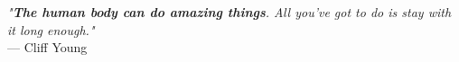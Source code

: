 
\begin{flushright}
    \emph{"\textbf{The human body can do amazing things}. All you’ve got to do is stay with it long enough."}\\
    — Cliff Young
\end{flushright}